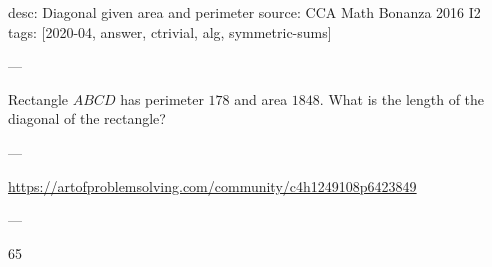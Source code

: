 desc: Diagonal given area and perimeter
source: CCA Math Bonanza 2016 I2
tags: [2020-04, answer, ctrivial, alg, symmetric-sums]

---

Rectangle $ABCD$ has perimeter $178$ and area $1848$. What is the length of the diagonal of the rectangle?

---

\url{https://artofproblemsolving.com/community/c4h1249108p6423849}

---

65
